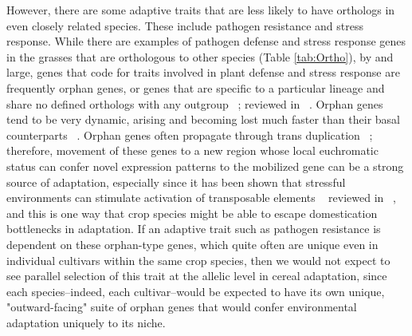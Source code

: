 \documentclass[12pt]{article}
\newcommand{\mbh}[1]{\textcolor{red}{\normalsize  #1}}
\begin{document}
However, there are some adaptive traits that are less likely to have orthologs in even closely related species.
These include pathogen resistance and stress response.
While there are examples of pathogen defense and stress response genes in the grasses that are orthologous to other species (Table \ref{tab:Ortho}), by and large, genes that code for traits involved in plant defense and stress response are frequently orphan genes, or genes that are specific to a particular lineage and share no defined orthologs with any outgroup ~\citep{Woodhouse2011}; reviewed in ~\citep{Arendsee2014}.
Orphan genes tend to be very dynamic, arising and becoming lost much faster than their basal counterparts ~\citep{Freeling2008}.
 Orphan genes often propagate through trans duplication ~\citep{Freeling2008, Arendsee2014}; therefore, movement of these genes to a new region whose local euchromatic status can confer novel expression patterns to the mobilized gene can be a strong source of adaptation, especially since it has been shown that stressful environments can stimulate activation of transposable elements ~\citep{Beguiristain2001, Makarevitch2015}  reviewed in ~\citep{Negi2016}, and this is one way that crop species might be able to escape domestication bottlenecks in adaptation. 
 If an adaptive trait such as pathogen resistance is dependent on these orphan-type genes, which quite often are unique even in individual cultivars within the same crop species, then we would not expect to see parallel selection of this trait at the allelic level in cereal adaptation, since each species--indeed, each cultivar--would be expected to have its own unique, "outward-facing" suite of orphan genes that would confer environmental adaptation uniquely to its niche.

\end{document}
